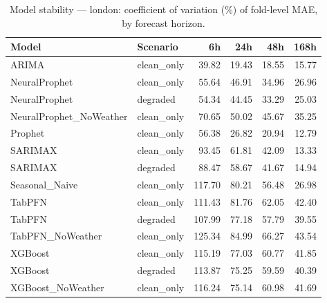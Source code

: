 \begin{table}[h]
\centering
\caption{Model stability — london: coefficient of variation (\%) of fold-level MAE, by forecast horizon.}
\label{tab:stability_london}
\begin{tabular}{llrrrr}
\toprule
Model & Scenario & 6h & 24h & 48h & 168h \\
\midrule
ARIMA & clean\_only & 39.82 & 19.43 & 18.55 & 15.77 \\
NeuralProphet & clean\_only & 55.64 & 46.91 & 34.96 & 26.96 \\
NeuralProphet & degraded & 54.34 & 44.45 & 33.29 & 25.03 \\
NeuralProphet\_NoWeather & clean\_only & 70.65 & 50.02 & 45.67 & 35.25 \\
Prophet & clean\_only & 56.38 & 26.82 & 20.94 & 12.79 \\
SARIMAX & clean\_only & 93.45 & 61.81 & 42.09 & 13.33 \\
SARIMAX & degraded & 88.47 & 58.67 & 41.67 & 14.94 \\
Seasonal\_Naive & clean\_only & 117.70 & 80.21 & 56.48 & 26.98 \\
TabPFN & clean\_only & 111.43 & 81.76 & 62.05 & 42.40 \\
TabPFN & degraded & 107.99 & 77.18 & 57.79 & 39.55 \\
TabPFN\_NoWeather & clean\_only & 125.34 & 84.99 & 66.27 & 43.54 \\
XGBoost & clean\_only & 115.19 & 77.03 & 60.77 & 41.85 \\
XGBoost & degraded & 113.87 & 75.25 & 59.59 & 40.39 \\
XGBoost\_NoWeather & clean\_only & 116.24 & 75.14 & 60.98 & 41.69 \\
\bottomrule
\end{tabular}
\end{table}
